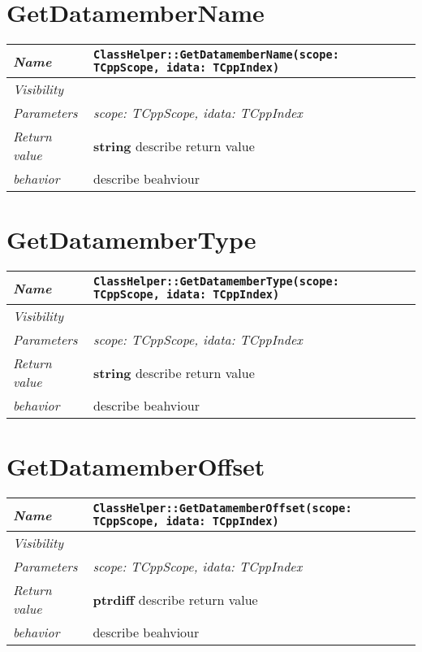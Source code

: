  \section{GetDatamemberName}
\begin{longtable}{p{3cm} @{\hskip 1cm} p{12cm}}
 \hline
\textit{Name} & \texttt{ClassHelper::GetDatamemberName(scope: TCppScope, idata: TCppIndex)}\\
\hline
 \textit{Visibility} & \\
\hline
\textit{Parameters} & \textit{scope: TCppScope, idata: TCppIndex}\\
\hline
\textit{Return value} & \textbf{ string} describe return value\\
  \hline
 \textit{behavior} & describe beahviour \\
\hline
\end{longtable} \pagebreak
 \section{GetDatamemberType}
\begin{longtable}{p{3cm} @{\hskip 1cm} p{12cm}}
 \hline
\textit{Name} & \texttt{ClassHelper::GetDatamemberType(scope: TCppScope, idata: TCppIndex)}\\
\hline
 \textit{Visibility} & \\
\hline
\textit{Parameters} & \textit{scope: TCppScope, idata: TCppIndex}\\
\hline
\textit{Return value} & \textbf{ string} describe return value\\
  \hline
 \textit{behavior} & describe beahviour \\
\hline
\end{longtable} \pagebreak
 \section{GetDatamemberOffset}
\begin{longtable}{p{3cm} @{\hskip 1cm} p{12cm}}
 \hline
\textit{Name} & \texttt{ClassHelper::GetDatamemberOffset(scope: TCppScope, idata: TCppIndex)}\\
\hline
 \textit{Visibility} & \\
\hline
\textit{Parameters} & \textit{scope: TCppScope, idata: TCppIndex}\\
\hline
\textit{Return value} & \textbf{ ptrdiff} describe return value\\
  \hline
 \textit{behavior} & describe beahviour \\
\hline
\end{longtable} \pagebreak
